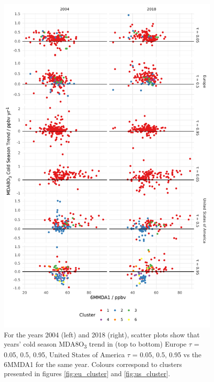 \documentclass[journal abbreviation, manuscript]{copernicus}
\begin{document}
\begin{figure}[p]
\centering
\includegraphics[height=0.9\textheight]{figures/paper_figures/f11_mda8_cold_cluster_mda8_6mmda1.pdf}
\caption{For the years 2004 (left) and 2018 (right), scatter plots show that years' cold season MDA8O\textsubscript{3} trend in (top to bottom) Europe $\tau$ = 0.05, 0.5, 0.95, United States of America $\tau$ = 0.05, 0.5, 0.95 vs the 6MMDA1 for the same year. Colours correspond to clusters presented in figures \ref{fig:eu_cluster} and \ref{fig:us_cluster}.}
\label{fig:mda8_cold_cluster_mda8_6mmda1}
\end{figure}
\clearpage



\end{document}
